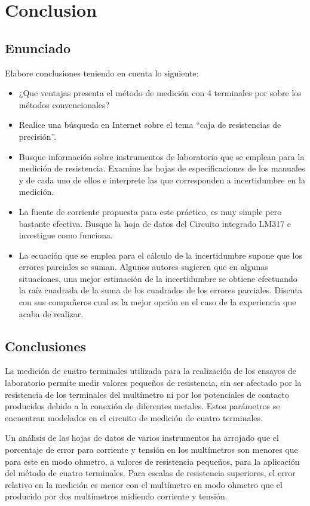 \chapter{Conclusion}
\section{Enunciado}
Elabore conclusiones teniendo en cuenta lo siguiente:
\begin{itemize}
  \item ¿Que ventajas presenta el método de medición con 4 terminales por sobre los métodos convencionales?
  \item Realice una búsqueda en Internet sobre el tema “caja de resistencias de precisión”.
  \item Busque información sobre instrumentos de laboratorio que se emplean para la medición de resistencia. Examine las hojas de especificaciones de los manuales y de cada uno de ellos e interprete las que corresponden a incertidumbre en la medición.
  \item La fuente de corriente propuesta para este práctico, es muy simple pero bastante efectiva. Busque la hoja de datos del Circuito integrado LM317 e investigue como funciona.
  \item La ecuación que se emplea para el cálculo de la incertidumbre supone que los errores parciales se suman. Algunos autores sugieren que en algunas situaciones, una mejor estimación de la incertidumbre se obtiene efectuando la raíz cuadrada de la suma de los cuadrados de los errores parciales. Discuta con sus compañeros cual es la mejor opción en el caso de la experiencia que acaba de realizar. 
\end{itemize}

\section{Conclusiones}
La medición de cuatro terminales utilizada para la realización de los ensayos de laboratorio permite medir valores pequeños de resistencia, sin ser afectado por la resistencia de los terminales del multímetro ni por los potenciales de contacto producidos debido a la conexión de diferentes metales.
Estos parámetros se encuentran modelados en el circuito de medición de cuatro terminales.

Un análisis de las hojas de datos de varios instrumentos ha arrojado que el porcentaje de error para corriente y tensión en los multímetros son menores que para este en modo ohmetro, a valores de resistencia pequeños, para la aplicación del método de cuatro terminales.
Para escalas de resistencia superiores, el error relativo en la medición es menor con el multímetro en modo ohmetro que el producido por dos multímetros midiendo corriente y tensión.

